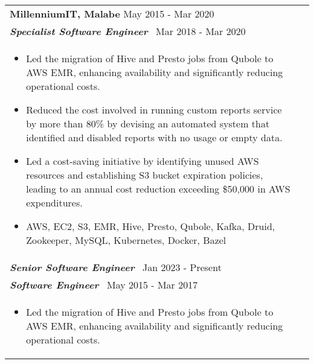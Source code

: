 \documentclass[a4paper,8pt]{article}
\begin{document}
  \begin{tabularx}{\linewidth}{ @{}l r@{} }
    \textbf{{MillenniumIT, Malabe}} \hfill \color[HTML]{371e77} May 2015 - Mar 2020 \\[4pt]
    
    \color[HTML]{371e77}\textbf{\textit{Specialist Software Engineer}}\ \hfill \color[HTML]{4B28A4} Mar 2018 - Mar 2020 \\[5pt]
    \begin{minipage}[t]{\linewidth}
        \begin{itemize}[nosep,after=\strut, leftmargin=2em, itemsep=2pt]
            \item Led the migration of Hive and Presto jobs from Qubole to AWS EMR, enhancing availability and significantly reducing operational costs.
            \item Reduced the cost involved in running custom reports service by more than 80\% by devising an automated system that identified and disabled reports with no usage or empty data.
            \item Led a cost-saving initiative by identifying unused AWS resources and establishing S3 bucket expiration policies, leading to an annual cost reduction exceeding \$50,000 in AWS expenditures.
            \item AWS, EC2, S3, EMR, Hive, Presto, Qubole, Kafka, Druid, Zookeeper, MySQL, Kubernetes, Docker, Bazel
        \end{itemize}
    \end{minipage} \\[10pt]
    
    \color[HTML]{371e77}\textbf{\textit{Senior Software Engineer}}\ \hfill \color[HTML]{4B28A4} Jan 2023 - Present \\[5pt]
  

    
    \color[HTML]{371e77}\textbf{\textit{Software Engineer}}\ \hfill \color[HTML]{4B28A4} May 2015 - Mar 2017 \\[5pt]
    \begin{minipage}[t]{\linewidth}
        \begin{itemize}[nosep,after=\strut, leftmargin=2em, itemsep=2pt]
            \item Led the migration of Hive and Presto jobs from Qubole to AWS EMR, enhancing availability and significantly reducing operational costs.
        \end{itemize}
    \end{minipage}
    \end{tabularx}\\[3pt]
\end{document}

